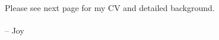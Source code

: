 
\vspace{3ex}

Please see next page for my CV and detailed background. \\
\paragraph*{}
\begin{flushright} -- Joy\end{flushright}
